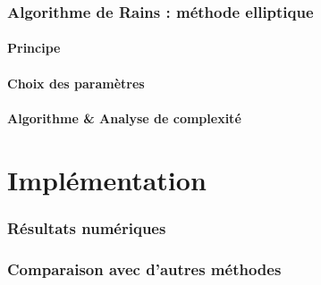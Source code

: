 \documentclass[a4paper]{article} %
\numberwithin{section}{part}
\numberwithin{equation}{section}
\begin{document}
\section{Algorithme de Rains : méthode elliptique}
\subsection{Principe}

\subsection{Choix des paramètres}

\subsection{Algorithme \& Analyse de complexité}

\part{Implémentation}
\section{Résultats numériques}

\section{Comparaison avec d'autres méthodes}
\end{document}
